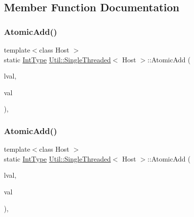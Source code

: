 \subsection{Member Function Documentation}
\mbox{\label{classUtil_1_1SingleThreaded_a8ecefde4f84af6dc4632e82d4898da2e}} 
\subsubsection{\texorpdfstring{AtomicAdd()}{AtomicAdd()}\hspace{0.1cm}{\footnotesize\ttfamily [1/2]}}
{\footnotesize\ttfamily template$<$class Host $>$ \\
static \mbox{\hyperlink{classUtil_1_1SingleThreaded_a35932213fb0c15a7b67ced79bc2af4c6}{Int\+Type}} \mbox{\hyperlink{classUtil_1_1SingleThreaded}{Util\+::\+Single\+Threaded}}$<$ Host $>$\+::Atomic\+Add (\begin{DoxyParamCaption}\item[{volatile \mbox{\hyperlink{classUtil_1_1SingleThreaded_a35932213fb0c15a7b67ced79bc2af4c6}{Int\+Type}} \&}]{lval,  }\item[{\mbox{\hyperlink{classUtil_1_1SingleThreaded_a35932213fb0c15a7b67ced79bc2af4c6}{Int\+Type}}}]{val }\end{DoxyParamCaption})\hspace{0.3cm}{\ttfamily [inline]}, {\ttfamily [static]}}

\mbox{\label{classUtil_1_1SingleThreaded_a8ecefde4f84af6dc4632e82d4898da2e}} 
\subsubsection{\texorpdfstring{AtomicAdd()}{AtomicAdd()}\hspace{0.1cm}{\footnotesize\ttfamily [2/2]}}
{\footnotesize\ttfamily template$<$class Host $>$ \\
static \mbox{\hyperlink{classUtil_1_1SingleThreaded_a35932213fb0c15a7b67ced79bc2af4c6}{Int\+Type}} \mbox{\hyperlink{classUtil_1_1SingleThreaded}{Util\+::\+Single\+Threaded}}$<$ Host $>$\+::Atomic\+Add (\begin{DoxyParamCaption}\item[{volatile \mbox{\hyperlink{classUtil_1_1SingleThreaded_a35932213fb0c15a7b67ced79bc2af4c6}{Int\+Type}} \&}]{lval,  }\item[{\mbox{\hyperlink{classUtil_1_1SingleThreaded_a35932213fb0c15a7b67ced79bc2af4c6}{Int\+Type}}}]{val }\end{DoxyParamCaption})\hspace{0.3cm}{\ttfamily [inline]}, {\ttfamily [static]}}

